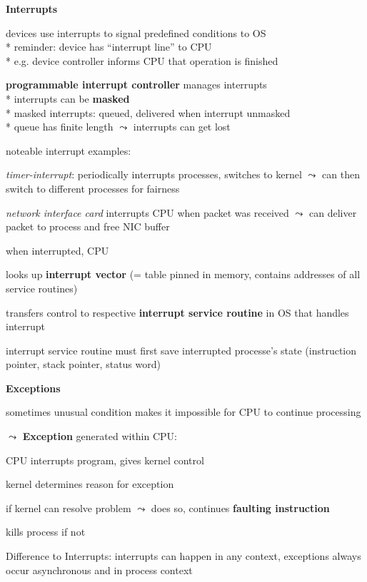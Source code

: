 \textbf{Interrupts}
\begin{items}
	\item devices use interrupts to signal predefined conditions to OS \\*
		reminder: device has "`interrupt line"' to CPU \\*
		e.g. device controller informs CPU that operation is finished
	\item \textbf{programmable interrupt controller} manages interrupts \\*
		interrupts can be \textbf{masked} \\*
		masked interrupts: queued, delivered when interrupt unmasked \\*
		queue has finite length \( \leadsto \) interrupts can get lost
	\item noteable interrupt examples:
	\begin{enumeration}
		\item \emph{timer-interrupt}: periodically interrupts processes, switches to kernel \( \leadsto \) can then switch to different processes for fairness
		\item \emph{network interface card} interrupts CPU when packet was received \( \leadsto \) can deliver packet to process and free NIC buffer
	\end{enumeration}
	\item when interrupted, CPU
	\begin{enumeration}
		\item looks up \textbf{interrupt vector} (= table pinned in memory, contains addresses of all service routines)
		\item transfers control to respective \textbf{interrupt service routine} in OS that handles interrupt
	\end{enumeration}
	\item interrupt service routine must first save interrupted processe's state (instruction pointer, stack pointer, status word)
\end{items}

\newpage

\textbf{Exceptions}
\begin{items}
	\item sometimes unusual condition makes it impossible for CPU to continue processing
	\item \( \leadsto \) \textbf{Exception} generated within CPU:
	\begin{enumeration}
		\item CPU interrupts program, gives kernel control
		\item kernel determines reason for exception
		\item if kernel can resolve problem \( \leadsto \) does so, continues \textbf{faulting instruction}
		\item kills process if not
	\end{enumeration}
	\item Difference to Interrupts: interrupts can happen in any context, exceptions always occur asynchronous and in process context
\end{items}

